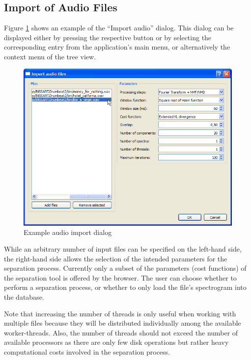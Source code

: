 \subsection{Import of Audio Files}

Figure \ref{figure:ProcessCreation} shows an example of the ``Import audio''
dialog. This dialog can be displayed either by pressing the respective button or
by selecting the corresponding entry from the application's main menu, or
alternatively the context menu of the tree view.

\begin{figure}
    \includegraphics[width=\textwidth]{images/ProcessCreation.png}
    \caption{%
        \label{figure:ProcessCreation}%
        Example audio import dialog
    }
\end{figure}

While an arbitrary number of input files can be specified on the left-hand
side, the right-hand side allows the selection of the intended parameters for
the separation process. Currently only a subset of the parameters (\eg cost
functions) of the separation tool is offered by the browser. The user can
choose whether to perform a separation process, or whether to only load the
file's spectrogram into the database.

Note that increasing the number of threads is only useful when working with
multiple files because they will be distributed individually among the available
worker-threads. Also, the number of threads should not exceed the number of
available processors as there are only few disk operations but rather heavy
computational costs involved in the separation process.

